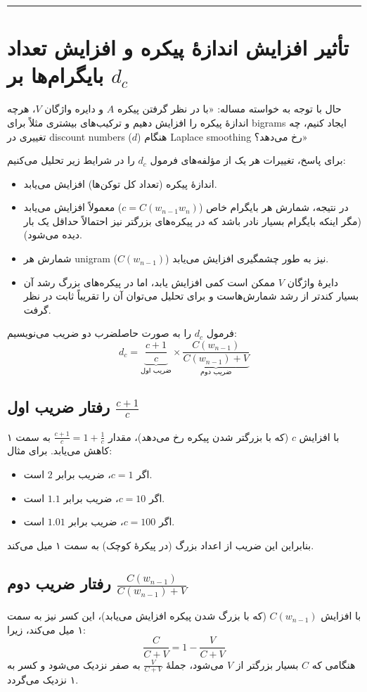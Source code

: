 \documentclass[11pt,a4paper]{article}
\newcommand{\en}[1]{\textenglish{#1}}
\newcommand{\separator}{\vspace{1em}\noindent\rule{\linewidth}{0.4pt}\vspace{1em}}
\begin{document}
\separator
\section{تأثیر افزایش اندازهٔ پیکره و افزایش تعداد بایگرام‌ها بر \(d_c\)}
حال با توجه به خواسته مساله:  
«با در نظر گرفتن پیکره \(A\) و دایره واژگان \(V\)، هرچه اندازهٔ پیکره را افزایش دهیم و ترکیب‌های بیشتری مثلاً برای \en{bigrams} ایجاد کنیم، چه تغییری در \en{discount numbers (\(d\))} هنگام \en{Laplace smoothing} رخ می‌دهد؟»

برای پاسخ، تغییرات هر یک از مؤلفه‌های فرمول \(d_c\) را در شرایط زیر تحلیل می‌کنیم:
\begin{itemize}
\item اندازهٔ پیکره (تعداد کل توکن‌ها) افزایش می‌یابد.
\item در نتیجه، شمارش هر بایگرام خاص (\(c = C(w_{n-1}w_n)\)) معمولاً افزایش می‌یابد (مگر اینکه بایگرام بسیار نادر باشد که در پیکره‌های بزرگتر نیز احتمالاً حداقل یک بار دیده می‌شود).
\item شمارش هر \en{unigram} (\(C(w_{n-1})\)) نیز به طور چشمگیری افزایش می‌یابد.
\item دایرهٔ واژگان \(V\) ممکن است کمی افزایش یابد، اما در پیکره‌های بزرگ رشد آن بسیار کندتر از رشد شمارش‌هاست و برای تحلیل می‌توان آن را تقریباً ثابت در نظر گرفت.
\end{itemize}

فرمول \(d_c\) را به صورت حاصلضرب دو ضریب می‌نویسیم:
\[
d_c = \underbrace{\frac{c+1}{c}}_{\text{ضریب اول}} \times \underbrace{\frac{C(w_{n-1})}{C(w_{n-1}) + V}}_{\text{ضریب دوم}}
\]

\subsection*{رفتار ضریب اول \(\frac{c+1}{c}\)}
با افزایش \(c\) (که با بزرگتر شدن پیکره رخ می‌دهد)، مقدار \(\frac{c+1}{c} = 1 + \frac{1}{c}\) به سمت ۱ کاهش می‌یابد. برای مثال:
\begin{itemize}
\item اگر \(c=1\)، ضریب برابر \(2\) است.
\item اگر \(c=10\)، ضریب برابر \(1.1\) است.
\item اگر \(c=100\)، ضریب برابر \(1.01\) است.
\end{itemize}
بنابراین این ضریب از اعداد بزرگ (در پیکرهٔ کوچک) به سمت ۱ میل می‌کند.

\subsection*{رفتار ضریب دوم \(\frac{C(w_{n-1})}{C(w_{n-1}) + V}\)}
با افزایش \(C(w_{n-1})\) (که با بزرگ شدن پیکره افزایش می‌یابد)، این کسر نیز به سمت ۱ میل می‌کند، زیرا:
\[
\frac{C}{C+V} = 1 - \frac{V}{C+V}
\]
هنگامی که \(C\) بسیار بزرگتر از \(V\) می‌شود، جملهٔ \(\frac{V}{C+V}\) به صفر نزدیک می‌شود و کسر به ۱ نزدیک می‌گردد.
\end{document}
